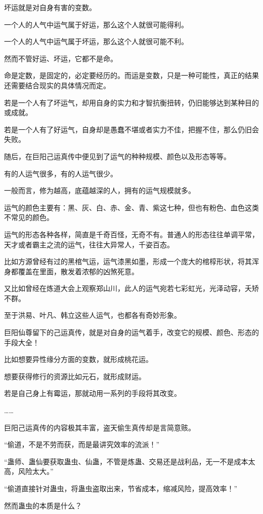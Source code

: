 \begin{this_body}
坏运就是对自身有害的变数。

一个人的人气中运气属于好运，那么这个人就很可能得利。

一个人的人气中运气属于坏运，那么这个人就很可能不利。

然而不管好运、坏运，它都不是命。

命是定数，是固定的，必定要经历的。而运是变数，只是一种可能性，真正的结果还需要结合现实的具体情况而定。

若是一个人有了坏运气，却用自身的实力和才智抗衡扭转，仍旧能够达到某种目的或成就。

若是一个人有了好运气，自身却是愚蠢不堪或者实力不佳，把握不住，那么仍旧会失败。

随后，在巨阳己运真传中便见到了运气的种种规模、颜色以及形态等等。

有的人运气很多，有的人运气很少。

一般而言，修为越高，底蕴越深的人，拥有的运气规模就多。

运气的颜色主要有：黑、灰、白、赤、金、青、紫这七种，但也有粉色、血色这类不常见的颜色。

运气的形态各种各样，简直是千奇百怪，无奇不有。普通人的形态往往单调平常，天才或者霸主之流的运气，往往大异常人，千姿百态。

比如方源曾经有过的黑棺气运，运气漆黑如墨，形成一个庞大的棺椁形状，将其浑身都覆盖在里面，散发着浓郁的凶煞死意。

又比如曾经在炼道大会上观察郑山川，此人的运气宛若七彩虹光，光泽动容，夭矫不群。

至于洪易、叶凡、韩立这些人运气，也都各有奇妙形象。

巨阳仙尊留下的己运真传，就是对自身的运气着手，改变它的规模、颜色、形态的手段大全！

比如想要异性缘分方面的变数，就形成桃花运。

想要获得修行的资源比如元石，就形成财运。

若是自己身上有霉运，那就动用一系列的手段将其改变。

……

巨阳己运真传的内容极其丰富，盗天偷生真传却是言简意赅。

“偷道，不是不劳而获，而是最讲究效率的流派！”

“蛊师、蛊仙要获取蛊虫、仙蛊，不管是炼蛊、交易还是战利品，无一不是成本太高，风险太大。”

“偷道直接针对蛊虫，将蛊虫盗取出来，节省成本，缩减风险，提高效率！”

然而蛊虫的本质是什么？


\end{this_body}
